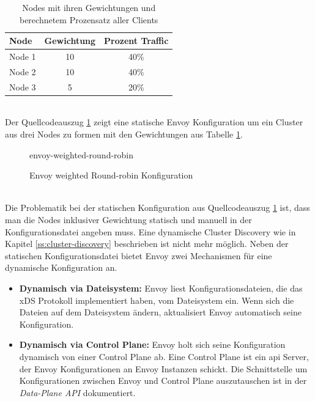 \begin{table}[h!]
\centering
\renewcommand{\arraystretch}{1.5}
\begin{tabular}{|l|c|c|}
    \hline
    \textbf{Node} & \textbf{Gewichtung} & \textbf{Prozent Traffic} \\
    \hline
    \hline
    Node 1 & 10 & 40\% \\
    \hline
    Node 2 & 10 & 40\% \\
    \hline
    Node 3 & 5 & 20\% \\
    \hline
\end{tabular}
\caption{Nodes mit ihren Gewichtungen und berechnetem Prozensatz aller Clients}
\label{table:example-cluster-weight}
\end{table}
\\
Der Quellcodeauszug \ref{code:envoy-cluster-weight} zeigt eine statische Envoy Konfiguration um ein Cluster aus drei Nodes zu formen mit den Gewichtungen aus Tabelle \ref{table:example-cluster-weight}.
\begin{figure}
    {envoy-weighted-round-robin}
    \caption{Envoy weighted Round-robin Konfiguration}
    \label{code:envoy-cluster-weight}
\end{figure}
\\
Die Problematik bei der statischen Konfiguration aus Quellcodeauszug \ref{code:envoy-cluster-weight} ist, dass man die Nodes inklusiver Gewichtung statisch und manuell in der Konfigurationsdatei angeben muss. Eine dynamische Cluster Discovery wie in Kapitel \ref{ss:cluster-discovery} beschrieben ist nicht mehr möglich.
Neben der statischen Konfigurationsdatei bietet Envoy zwei Mechanismen für eine dynamische Konfiguration an.
\begin{itemize}
  \item \textbf{Dynamisch via Dateisystem:} Envoy liest Konfigurationsdateien, die das xDS Protokoll implementiert haben, vom Dateisystem ein. Wenn sich die Dateien auf dem Dateisystem ändern, aktualisiert Envoy automatisch seine Konfiguration.
    \cite{ConfigurationDynamicFilesystem}
  \item \textbf{Dynamisch via Control Plane:} Envoy holt sich seine Konfiguration dynamisch von einer Control Plane ab. Eine Control Plane ist ein \ac{api} Server, der Envoy Konfigurationen an Envoy Instanzen schickt. Die Schnittstelle um Konfigurationen zwischen Envoy und Control Plane auszutauschen ist in der \textit{Data-Plane API}\cite{EnvoyproxyDataplaneapi2021} dokumentiert.
    \cite{ConfigurationDynamicControl}
\end{itemize}
